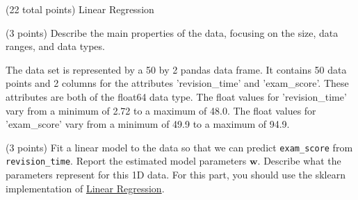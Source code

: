 \documentclass[12pt]{article}
\begin{document}
\maketitle
\thispagestyle{empty}







\clearpage

\begin{question}{(22 total points) Linear Regression}




%
%
\begin{subquestion}{(3 points) Describe the main properties of the data, focusing on the size, data ranges, and data types.   
}


\begin{answerbox}{10em}
The data set is represented by a 50 by 2 pandas data frame. It contains 50 data points and 2 columns for the attributes 'revision\_time' and 'exam\_score'. These attributes are both of the float64 data type. The float values for 'revision\_time' vary from a minimum of 2.72 to a maximum of 48.0. The float values for 'exam\_score' vary from a minimum of 49.9 to a maximum of 94.9. 
\end{answerbox}



\end{subquestion}




%
%
\begin{subquestion}{(3 points) Fit a linear model to the data so that we can predict \texttt{exam\_score} from \texttt{revision\_time}. 
Report the estimated model parameters $\mathbf{w}$. 
Describe what the parameters represent for this 1D data. 
For this part, you should use the sklearn implementation of \href{https://scikit-learn.org/0.19/modules/generated/sklearn.linear_model.LinearRegression.html}{Linear Regression}.\\
}



\end{subquestion}
\end{question}
\end{document}
